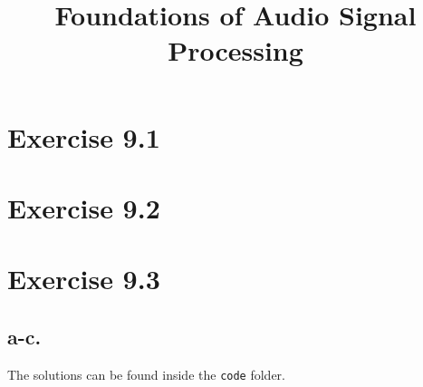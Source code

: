 \documentclass[12pt]{article}
\title{Foundations of Audio Signal Processing\\ \ass}
\author{\auth}
\begin{document}
	\maketitle
	\section*{Exercise 9.1}
	\section*{Exercise 9.2}
	\section*{Exercise 9.3}
	\subsection*{a-c.} The solutions can be found inside the \texttt{code} folder.
\end{document}
